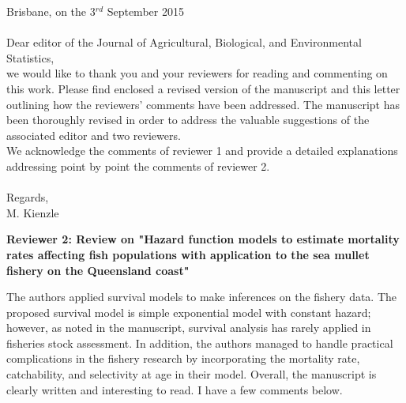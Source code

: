 \documentclass[11pt]{article}
\begin{document}
\begin{spacing}{1.2} 
\hspace{9cm} Brisbane, on the 3$^{rd}$ September 2015\\ \\

\noindent Dear editor of the Journal of Agricultural, Biological, and Environmental Statistics, \\

we would like to thank you and your reviewers for reading and commenting on this work. Please find enclosed a revised version of the manuscript and this letter outlining how the reviewers' comments have been addressed. The manuscript has been thoroughly revised in order to address the valuable suggestions of the associated editor and two reviewers. \\

We acknowledge the comments of reviewer 1 and provide a detailed explanations addressing point by point the comments of reviewer 2.\\ \\ 

\noindent Regards,\\
\noindent M. Kienzle \\
\vspace{0.2cm}

{\bf Reviewer 2: Review on "Hazard function models to estimate mortality rates affecting fish populations with application to the sea mullet fishery on the Queensland coast" 

The authors applied survival models to make inferences on the fishery data. The proposed survival model is simple exponential model with constant hazard; however, as noted in the manuscript, survival analysis has rarely applied in fisheries stock assessment. In addition, the authors managed to handle practical complications in the fishery research by incorporating the mortality rate, catchability, and selectivity at age in their model. Overall, the manuscript is clearly written and interesting to read. I have a few comments below.}


\end{spacing}
\end{document}
